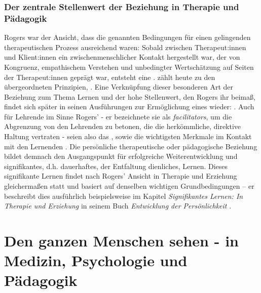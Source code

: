 \documentclass[
  twoside,
  parskip=half-,
]{scrreprt}
\begin{document}
\subsection{Der zentrale Stellenwert der Beziehung in Therapie und Pädagogik}
Rogers war der Ansicht, dass die genannten Bedingungen für einen gelingenden therapeutischen Prozess ausreichend waren: Sobald zwischen Therapeut:innen und Klient:innen ein zwischenmenschlicher Kontakt hergestellt war, der von Kongruenz, empathischem Verstehen und unbedingter Wertschätzung auf Seiten der Therapeut:innen geprägt war, entsteht eine .  zählt heute zu den übergeordneten Prinzipien, . Eine Verknüpfung dieser besonderen Art der Beziehung zum Thema Lernen und der hohe Stellenwert, den Rogers ihr beimaß, findet sich später in seinen Ausführungen zur Ermöglichung eines  wieder: . Auch für Lehrende im Sinne Rogers' - er bezeichnete sie als \textit{facilitators}, um die Abgrenzung von den Lehrenden zu betonen, die die herkömmliche, direktive Haltung vertraten -  seien also das ,  sowie  die wichtigsten Merkmale im Kontakt mit den Lernenden \autocite[107-114]{rogersLernenFreiheit}. Die persönliche therapeutische oder pädagogische Beziehung bildet demnach den Ausgangspunkt für erfolgreiche Weiterentwicklung und signifikantes, d.h. dauerhaftes, der Entfaltung dienliches, Lernen. Dieses signifikante Lernen findet nach Rogers' Ansicht in Therapie und Erziehung gleichermaßen statt und basiert auf denselben wichtigen Grundbedingungen -- er beschreibt dies ausführlich beispielsweise im Kapitel \textit{Signifikantes  Lernen: In Therapie und Erziehung} in seinem Buch \textit{Entwicklung der Persönlichkeit} \autocite[273-289]{rogers1961}. 

\chapter{Den ganzen Menschen sehen - in Medizin, Psychologie und Pädagogik}
\end{document}
